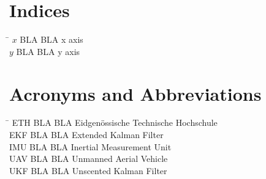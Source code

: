 \section*{Indices}
\begin{tabbing}
 \hspace*{1.6cm}  \= \kill
 $x$ \> BLA BLA x axis \\[0.5ex]
 $y$ \> BLA BLA y axis \\[0.5ex]
\end{tabbing}

\section*{Acronyms and Abbreviations}
\begin{tabbing}
 \hspace*{1.6cm}  \= \kill
 ETH \> BLA BLA Eidgenössische Technische Hochschule \\[0.5ex]
 EKF \> BLA BLA Extended Kalman Filter \\[0.5ex]
 IMU \> BLA BLA Inertial Measurement Unit \\[0.5ex]
 UAV \> BLA BLA Unmanned Aerial Vehicle \\[0.5ex]
 UKF \> BLA BLA Unscented Kalman Filter \\[0.5ex]
\end{tabbing}